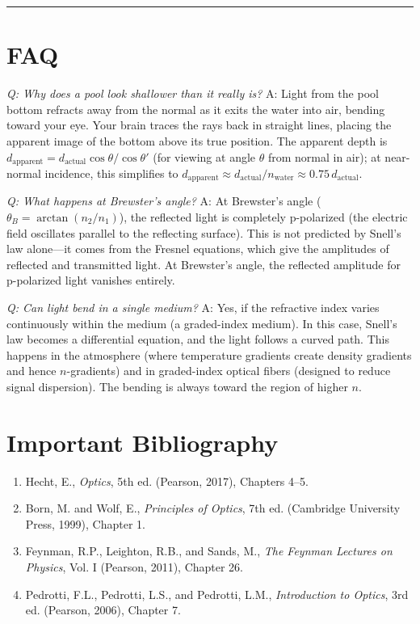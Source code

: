 \bigskip
\hrule
\bigskip
\section*{FAQ}

\textit{Q: Why does a pool look shallower than it really is?}
A: Light from the pool bottom refracts away from the normal as it exits the water into air, bending toward your eye. Your brain traces the rays back in straight lines, placing the apparent image of the bottom above its true position. The apparent depth is $d_{\text{apparent}} = d_{\text{actual}}\cos\theta/\cos\theta'$ (for viewing at angle $\theta$ from normal in air); at near-normal incidence, this simplifies to $d_{\text{apparent}} \approx d_{\text{actual}}/n_{\text{water}} \approx 0.75\,d_{\text{actual}}$.

\textit{Q: What happens at Brewster's angle?}
A: At Brewster's angle ($\theta_B = \arctan(n_2/n_1)$), the reflected light is completely p-polarized (the electric field oscillates parallel to the reflecting surface). This is not predicted by Snell's law alone---it comes from the Fresnel equations, which give the amplitudes of reflected and transmitted light. At Brewster's angle, the reflected amplitude for p-polarized light vanishes entirely.

\textit{Q: Can light bend in a single medium?}
A: Yes, if the refractive index varies continuously within the medium (a graded-index medium). In this case, Snell's law becomes a differential equation, and the light follows a curved path. This happens in the atmosphere (where temperature gradients create density gradients and hence $n$-gradients) and in graded-index optical fibers (designed to reduce signal dispersion). The bending is always toward the region of higher $n$.
\section*{Important Bibliography}
\begin{enumerate}
\item Hecht, E., \textit{Optics}, 5th ed. (Pearson, 2017), Chapters 4--5.
\item Born, M. and Wolf, E., \textit{Principles of Optics}, 7th ed. (Cambridge University Press, 1999), Chapter 1.
\item Feynman, R.P., Leighton, R.B., and Sands, M., \textit{The Feynman Lectures on Physics}, Vol. I (Pearson, 2011), Chapter 26.
\item Pedrotti, F.L., Pedrotti, L.S., and Pedrotti, L.M., \textit{Introduction to Optics}, 3rd ed. (Pearson, 2006), Chapter 7.
\end{enumerate}


